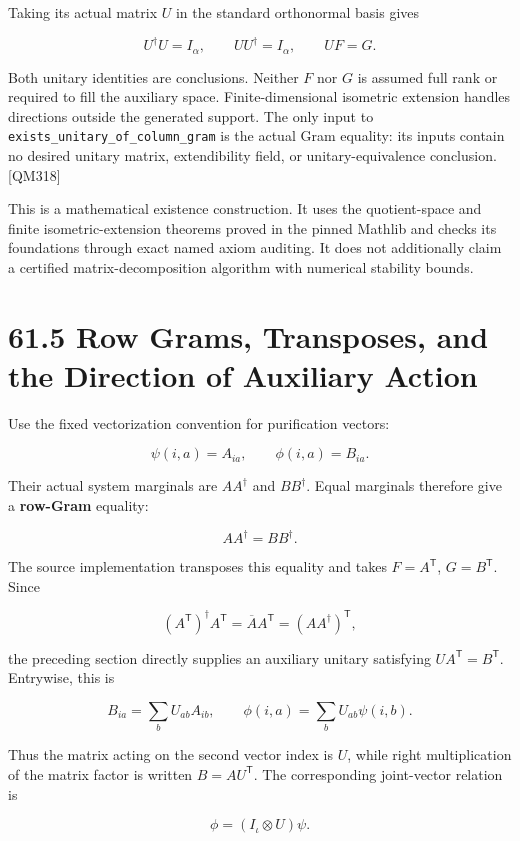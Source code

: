 \documentclass[
  11pt,
  oneside]{book}
\begin{document}
Taking its actual matrix \(U\) in the standard orthonormal basis gives

\[
U^\dagger U=I_\alpha,\qquad UU^\dagger=I_\alpha,
\qquad UF=G.
\]

Both unitary identities are conclusions. Neither \(F\) nor \(G\) is
assumed full rank or required to fill the auxiliary space.
Finite-dimensional isometric extension handles directions outside the
generated support. The only input to
\texttt{exists\_\allowbreak unitary\_\allowbreak of\_\allowbreak column\_\allowbreak gram} is the actual Gram equality:
its inputs contain no desired unitary matrix, extendibility field, or
unitary-equivalence conclusion. {[}QM318{]}

This is a mathematical existence construction. It uses the
quotient-space and finite isometric-extension theorems proved in the
pinned Mathlib and checks its foundations through exact named axiom
auditing. It does not additionally claim a certified
matrix-decomposition algorithm with numerical stability bounds.

\section{61.5 Row Grams, Transposes, and the Direction of Auxiliary
Action}

Use the fixed vectorization convention for purification vectors:

\[
\psi(i,a)=A_{ia},\qquad\phi(i,a)=B_{ia}.
\]

Their actual system marginals are \(AA^\dagger\) and \(BB^\dagger\).
Equal marginals therefore give a \textbf{row-Gram} equality:

\[
AA^\dagger=BB^\dagger.
\]

The source implementation transposes this equality and takes
\(F=A^\mathsf T\), \(G=B^\mathsf T\). Since

\[
(A^\mathsf T)^\dagger A^\mathsf T
=\overline A A^\mathsf T=(AA^\dagger)^\mathsf T,
\]

the preceding section directly supplies an auxiliary unitary satisfying
\(UA^\mathsf T=B^\mathsf T\). Entrywise, this is

\[
B_{ia}=\sum_bU_{ab}A_{ib},
\qquad
\phi(i,a)=\sum_bU_{ab}\psi(i,b).
\]

Thus the matrix acting on the second vector index is \(U\), while right
multiplication of the matrix factor is written \(B=AU^\mathsf T\). The
corresponding joint-vector relation is

\[
\phi=(I_\iota\otimes U)\psi.
\]
\end{document}
